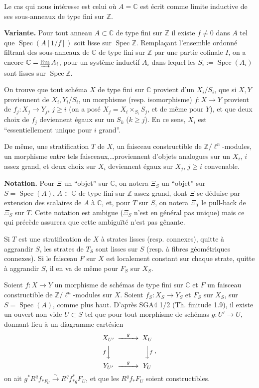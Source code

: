 \documentclass[12pt,a4paper]{article}
\theoremstyle{plain}
\theoremstyle{definition}
\theoremstyle{remark}
\DeclareMathOperator{\Spec}{Spec}
\newcommand{\CC}{\mathbb{C}}
\newcommand{\ZZ}{\mathbb{Z}}
\begin{document}
Le cas qui nous int\'eresse est celui o\`u $A = \CC$ est \'ecrit comme limite inductive de ses sous-anneaux de type fini sur $\ZZ$.

\medskip
\noindent\textbf{Variante.} Pour tout anneau $A \subset \CC$ de type fini sur $\ZZ$ il existe $f \neq 0$ dans $A$ tel que $\Spec(A[1/f])$ soit lisse sur $\Spec\ZZ$. Rempla\c{c}ant l'ensemble ordonn\'e filtrant des sous-anneaux de $\CC$ de type fini sur $\ZZ$ par une partie cofinale $I$, on a encore $\CC = \varinjlim A_i$, pour un syst\`eme inductif $A_i$ dans lequel les $S_i := \Spec(A_i)$ sont lisses sur $\Spec\ZZ$.

On trouve que tout sch\'ema $X$ de type fini sur $\CC$ provient d'un $X_i/S_i$, que si $X, Y$ proviennent de $X_i, Y_i/S_i$, un morphisme (resp. isomorphisme) $f: X \to Y$ provient de $f_j: X_j \to Y_j$, $j \geq i$ (on a pos\'e $X_j = X_i \times_{S_i} S_j$, et de m\^eme pour $Y$), et que deux choix de $f_j$ deviennent \'egaux sur un $S_k$ ($k \geq j$). En ce sens, $X_i$ est ``essentiellement unique pour $i$ grand''.

De m\^eme, une stratification $T$ de $X$, un faisceau constructible de $\ZZ/\ell^n$-modules, un morphisme entre tels faisceaux,\ldots proviennent d'objets analogues sur un $X_i$, $i$ assez grand, et deux choix sur $X_i$ deviennent \'egaux sur $X_j$, $j \geq i$ convenable.

\medskip
\noindent\textbf{Notation.} Pour $\Xi$ un ``objet'' sur $\CC$, on notera $\Xi_S$ un ``objet'' sur $S = \Spec(A)$, $A \subset \CC$ de type fini sur $\ZZ$ assez grand, dont $\Xi$ se d\'eduise par extension des scalaires de $A$ \`a $\CC$, et, pour $T$ sur $S$, on notera $\Xi_T$ le pull-back de $\Xi_S$ sur $T$. Cette notation est ambigue ($\Xi_S$ n'est en g\'en\'eral pas unique) mais ce qui pr\'ec\`ede assurera que cette ambigu\"it\'e n'est pas g\^enante.

Si $T$ est une stratification de $X$ \`a strates lisses (resp. connexes), quitte \`a aggrandir $S$, les strates de $T_S$ sont lisses sur $S$ (resp. \`a fibres g\'eom\'etriques connexes). Si le faisceau $F$ sur $X$ est localement constant sur chaque strate, quitte \`a aggrandir $S$, il en va de m\^eme pour $F_S$ sur $X_S$.

Soient $f: X \longrightarrow Y$ un morphisme de sch\'emas de type fini sur $\CC$ et $F$ un faisceau constructible de $\ZZ/\ell^n$-modules sur $X$. Soient $f_S: X_S \to Y_S$ et $F_S$ sur $X_S$, sur $S = \Spec(A)$, comme plus haut. D'apr\`es SGA4 1/2 (Th. finitude 1.9), il existe un ouvert non vide $U \subset S$ tel que pour tout morphisme de sch\'emas $g: U' \to U$, donnant lieu \`a un diagramme cart\'esien
\[
\begin{CD}
X_{U'} @>{g}>> X_U \\
@V{f}VV @VV{f}V \\
Y_{U'} @>{g}>> Y_U
\end{CD}\;,
\]
on ait $g^*R^qf_{*F_U} \xrightarrow{\sim} R^qf_{*g}^*F_U$, et que les $R^qf_*F_U$ soient constructibles.
\end{document}
